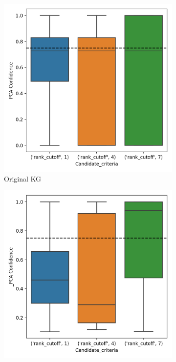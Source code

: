 \begin{figure}[h]
\centering
\begin{subfigure}{.5\textwidth}
  \centering
  \includegraphics[width=1\linewidth]{figures/results/ranks/PCA-rank_wn18rr.png}
  \caption{Original KG}
  \label{fig:PCA-rank_wn18rr_boxplot_sub}
\end{subfigure}%
\begin{subfigure}{.5\textwidth}
  \centering
  \includegraphics[width=1\linewidth]{figures/results/ranks/_PCA-rank_wn18rr.png}

\end{subfigure}
\end{figure}
